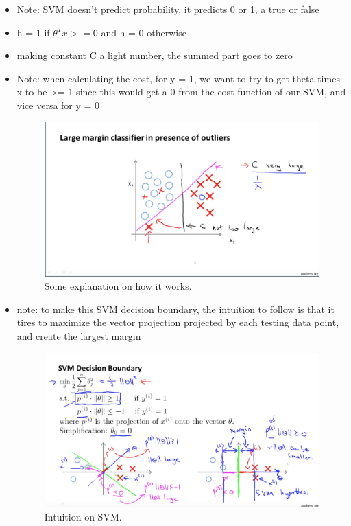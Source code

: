 \documentclass[]{article}
\begin{document}
\begin{itemize}
			\item Note: SVM doesn't predict probability, it predicts 0 or 1, a true or false
			\item h = 1 if $\theta^Tx >= 0$ and h = 0 otherwise
			\item making constant C a light number, the summed part goes to zero
			\item Note: when calculating the cost, for y = 1, we want to try to get theta times x to be >= 1 since this would get a 0 from the cost function of our SVM, and vice versa for y = 0
			\begin{figure}[ht!]
				\includegraphics[width= 1.5\textwidth,center]{Theta_X_Value.png}
				\caption{Some explanation on how it works.}
			\end{figure}
			
			\item note: to make this SVM decision boundary, the intuition to follow is that it tires to maximize the vector projection projected by each testing data point, and create the largest margin
			\begin{figure}[ht!]
				\includegraphics[width= 1.5\textwidth,center]{SVM_Intuition.png}
				\caption{Intuition on SVM.}
			\end{figure}
		\end{itemize}
		
\end{document}
